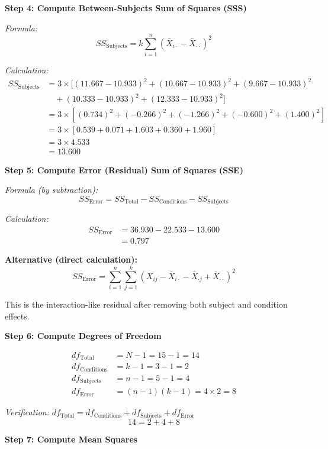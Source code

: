 \documentclass[12pt]{article}
\begin{document}
\begin{solution}
\textbf{Step 4: Compute Between-Subjects Sum of Squares (SSS)}

\textit{Formula:}
\[
SS_{\text{Subjects}} = k \sum_{i=1}^{n} (\bar{X}_{i\cdot} - \bar{X}_{\cdot\cdot})^2
\]

\textit{Calculation:}
\begin{align*}
SS_{\text{Subjects}} &= 3 \times [(11.667 - 10.933)^2 + (10.667 - 10.933)^2 + (9.667 - 10.933)^2 \\
&\quad + (10.333 - 10.933)^2 + (12.333 - 10.933)^2] \\
&= 3 \times [(0.734)^2 + (-0.266)^2 + (-1.266)^2 + (-0.600)^2 + (1.400)^2] \\
&= 3 \times [0.539 + 0.071 + 1.603 + 0.360 + 1.960] \\
&= 3 \times 4.533 \\
&= 13.600
\end{align*}

\textbf{Step 5: Compute Error (Residual) Sum of Squares (SSE)}

\textit{Formula (by subtraction):}
\[
SS_{\text{Error}} = SS_{\text{Total}} - SS_{\text{Conditions}} - SS_{\text{Subjects}}
\]

\textit{Calculation:}
\begin{align*}
SS_{\text{Error}} &= 36.930 - 22.533 - 13.600 \\
&= 0.797
\end{align*}

\textbf{Alternative (direct calculation):}
\[
SS_{\text{Error}} = \sum_{i=1}^{n}\sum_{j=1}^{k} (X_{ij} - \bar{X}_{i\cdot} - \bar{X}_{\cdot j} + \bar{X}_{\cdot\cdot})^2
\]

This is the interaction-like residual after removing both subject and condition effects.

\textbf{Step 6: Compute Degrees of Freedom}

\begin{align*}
df_{\text{Total}} &= N - 1 = 15 - 1 = 14 \\
df_{\text{Conditions}} &= k - 1 = 3 - 1 = 2 \\
df_{\text{Subjects}} &= n - 1 = 5 - 1 = 4 \\
df_{\text{Error}} &= (n-1)(k-1) = 4 \times 2 = 8
\end{align*}

\textit{Verification:} $df_{\text{Total}} = df_{\text{Conditions}} + df_{\text{Subjects}} + df_{\text{Error}}$
\[
14 = 2 + 4 + 8
\]

\textbf{Step 7: Compute Mean Squares}


\end{solution}
\end{document}
